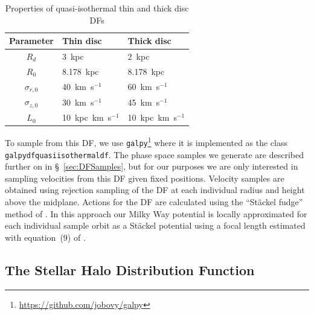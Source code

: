 \begin{table}
    \begin{center}
        \caption{Properties of quasi-isothermal thin and thick disc DFs}
        \label{table:discDFParameters}
        \begin{tabular}{cll}
            Parameter & Thin disc & Thick disc  \\
            \hline
            $R_{d}$          & 3~kpc               & 2~kpc              \\
            $R_{0}$          & 8.178~kpc           & 8.178~kpc          \\
            $\sigma_{r,0}$   & 40~km~s$^{-1}$      & 60~km~s$^{-1}$     \\
            $\sigma_{z,0}$   & 30~km~s$^{-1}$      & 45~km~s$^{-1}$     \\
            $L_{0}$          & 10~kpc~km~s$^{-1}$  & 10~kpc~km~s$^{-1}$ \\
        \end{tabular}
    \end{center}
\end{table}

To sample from this DF, we use \texttt{galpy}\footnote{\url{https://github.com/jobovy/galpy}} \parencite{bovy15} where it is implemented as the class \texttt{galpydfquasiisothermaldf}. The phase space samples we generate are described further on in \S~\ref{sec:DFSamples}, but for our purposes we are only interested in sampling velocities from this DF given fixed positions. Velocity samples are obtained using rejection sampling of the DF at each individual radius and height above the midplane. Actions for the DF are calculated using the ``St\"{a}ckel fudge'' method of \textcite{binney12}. In this approach our Milky Way potential is locally approximated for each individual sample orbit as a St\"{a}ckel potential using a focal length estimated with equation~(9) of \textcite{sanders12}.

\subsection{The Stellar Halo Distribution Function}
\label{subsec:HaloDistributionFunction}


